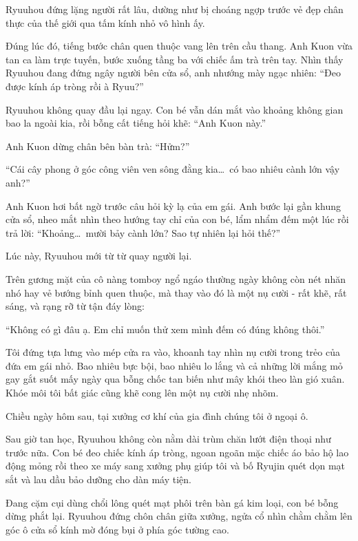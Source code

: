 \documentclass[../main.tex]{subfiles}
\begin{document}
Ryuuhou đứng lặng người rất lâu, dường như bị choáng ngợp trước vẻ đẹp chân thực của thế giới qua tấm kính nhỏ vô hình ấy.

Đúng lúc đó, tiếng bước chân quen thuộc vang lên trên cầu thang. Anh Kuon vừa tan ca làm trực tuyến, bước xuống tầng ba với chiếc ấm trà trên tay. Nhìn thấy Ryuuhou đang đứng ngây người bên cửa sổ, anh nhướng mày ngạc nhiên: ``Đeo được kính áp tròng rồi à Ryuu?''

Ryuuhou không quay đầu lại ngay. Con bé vẫn dán mắt vào khoảng không gian bao la ngoài kia, rồi bỗng cất tiếng hỏi khẽ: ``Anh Kuon này.''

Anh Kuon dừng chân bên bàn trà: ``Hửm?''

``Cái cây phong ở góc công viên ven sông đằng kia\dots\ có bao nhiêu cành lớn vậy anh?''

Anh Kuon hơi bất ngờ trước câu hỏi kỳ lạ của em gái. Anh bước lại gần khung cửa sổ, nheo mắt nhìn theo hướng tay chỉ của con bé, lẩm nhẩm đếm một lúc rồi trả lời: ``Khoảng\dots\ mười bảy cành lớn? Sao tự nhiên lại hỏi thế?''

Lúc này, Ryuuhou mới từ từ quay người lại.

Trên gương mặt của cô nàng tomboy ngổ ngáo thường ngày không còn nét nhăn nhó hay vẻ bướng bỉnh quen thuộc, mà thay vào đó là một nụ cười -  rất khẽ, rất sáng, và rạng rỡ từ tận đáy lòng:

``Không có gì đâu ạ. Em chỉ muốn thử xem mình đếm có đúng không thôi.''

Tôi đứng tựa lưng vào mép cửa ra vào, khoanh tay nhìn nụ cười trong trẻo của đứa em gái nhỏ. Bao nhiêu bực bội, bao nhiêu lo lắng và cả những lời mắng mỏ gay gắt suốt mấy ngày qua bỗng chốc tan biến như mây khói theo làn gió xuân. Khóe môi tôi bất giác cũng khẽ cong lên một nụ cười nhẹ nhõm.

\omk

Chiều ngày hôm sau, tại xưởng cơ khí của gia đình chúng tôi ở ngoại ô.

Sau giờ tan học, Ryuuhou không còn nằm dài trùm chăn lướt điện thoại như trước nữa. Con bé đeo chiếc kính áp tròng, ngoan ngoãn mặc chiếc áo bảo hộ lao động mỏng rồi theo xe máy sang xưởng phụ giúp tôi và bố Ryujin quét dọn mạt sắt và lau dầu bảo dưỡng cho dàn máy tiện.

Đang cặm cụi dùng chổi lông quét mạt phôi trên bàn gá kim loại, con bé bỗng dừng phắt lại. Ryuuhou đứng chôn chân giữa xưởng, ngửa cổ nhìn chằm chằm lên góc ô cửa sổ kính mờ đóng bụi ở phía góc tường cao.
\end{document}
